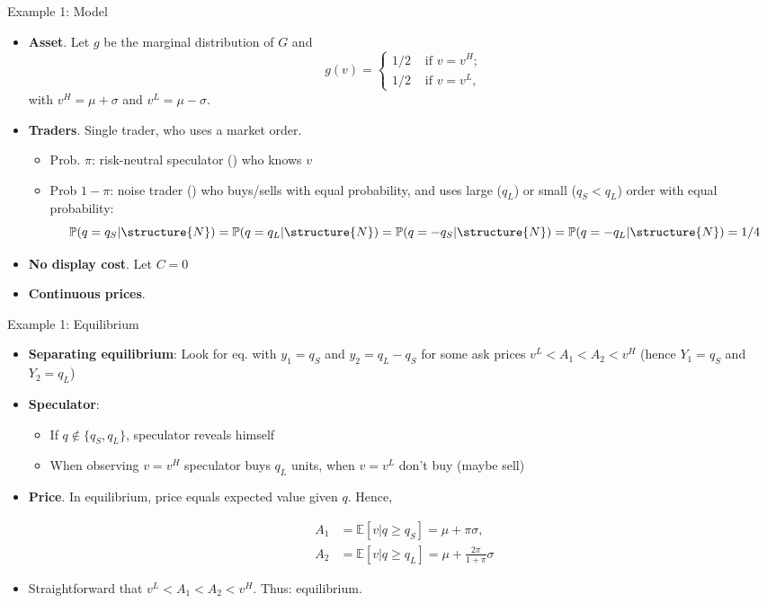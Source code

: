 \documentclass[english,10pt
,aspectratio=169
]{beamer}
\begin{document}
\begin{frame}{Example 1: Model} 
	\begin{itemize}
		\item \textbf{Asset}. Let $g$ be the marginal distribution of $G$ and
		\[
		g(v)=\left\{ \begin{aligned}
		1/2  & \text{ if } v=v^H; \\
		1/2 & \text{ if } v=v^L,
		\end{aligned}
		\right.
		\]
		with $v^{H}=\mu + \sigma $ and $v^{L}= \mu - \sigma $.
		\item \textbf{Traders}. Single trader, who uses a market order.
		\begin{itemize}
			\item Prob. $\pi$: risk-neutral speculator () who knows $v$
			\item Prob $1-\pi$: noise trader ()  who buys/sells with equal probability, and uses large ($q_L$) or small ($q_S<q_L$) order with equal probability:
			$$
			\mathbb{P}(q=q_S|\structure{N})= \mathbb{P}(q=q_L|\structure{N})=\mathbb{P}(q=-q_S|\structure{N})=\mathbb{P}(q=-q_L|\structure{N})=1/4
			$$
		\end{itemize}
		\item \textbf{No display cost}. Let $C=0$
		\item \textbf{Continuous prices}.
	\end{itemize}
\end{frame}


\begin{frame}{Example 1: Equilibrium}
	\begin{itemize}
		\item \textbf{Separating equilibrium}: Look for eq. with $y_{1}=q_{S}$ and $y_{2}=q_{L}-q_{S}$ for some ask prices $v^L<A_1<A_2<v^H$ (hence $Y_1=q_S$ and $Y_2=q_L$)
		\item \textbf{Speculator}: 
		\begin{itemize}
			\item If $q \notin \{q_S,q_L\}$, speculator reveals himself
			\item 
			When observing $v=v^{H}$ speculator buys $q_{L}$ units, when $v=v^L$ don't buy (maybe sell)
		\end{itemize}
		\item \textbf{Price}. In equilibrium, price equals expected value given $q$. Hence,
		\begin{block}{}
			\[\begin{aligned}
			A_1 & =\mathbb{E}[v|q \geq q_{S}] = \mu + \pi \sigma,\\
			A_2 & = \mathbb{E}[v|q \geq q_{L}] = \mu + \frac{2\pi}{1+\pi} \sigma
			\end{aligned}
			\]
		\end{block}
		\item Straightforward that $v^L<A_1<A_2<v^H$. Thus: equilibrium.
	\end{itemize}
\end{frame}
\end{document}
